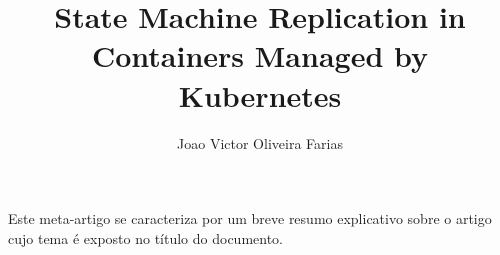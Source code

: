 \documentclass[12pt]{article}
\title{State Machine Replication in Containers Managed by Kubernetes}
\author{Joao Victor Oliveira Farias}
\begin{document}
 

\maketitle

\begin{abstract}
  
\end{abstract}
     
\begin{resumo} 
  Este meta-artigo se caracteriza por um breve resumo explicativo sobre o artigo cujo tema é exposto no título do documento. 
\end{resumo}




\end{document}
